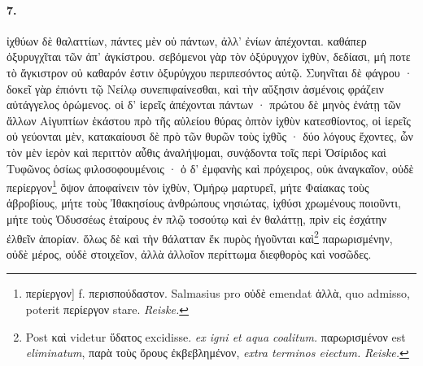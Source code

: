 \documentclass[a4paper, 11pt, oneside, polutonikogreek, german, landscape]{article}
\begin{document}
\paragraph{7.}
ἰχθύων δὲ θαλαττίων, πάντες μὲν οὐ πάντων, ἀλλ' ἐνίων ἀπέχονται. καθάπερ ὀξυρυγχῖται τῶν ἀπ' ἀγκίστρου. σεβόμενοι γὰρ τὸν ὀξύρυγχον ἰχθὺν, δεδίασι, μή ποτε τὸ ἄγκιστρον οὐ καθαρόν ἐστιν ὀξυρύγχου περιπεσόντος αὐτῷ. Συηνῖται δὲ φάγρου · δοκεῖ γὰρ ἐπιόντι τῷ Νείλῳ συνεπιφαίνεσθαι, καὶ τὴν αὔξησιν ἀσμένοις φράζειν αὐτάγγελος ὁρώμενος. οἱ δ' ἱερεῖς ἀπέχονται πάντων · πρώτου δὲ μηνὸς ἐνάτῃ τῶν ἄλλων Αἰγυπτίων ἑκάστου πρὸ τῆς αὐλείου θύρας ὀπτὸν ἰχθὺν κατεσθίοντος, οἱ ἱερεῖς οὐ γεύονται μὲν, κατακαίουσι δὲ πρὸ τῶν θυρῶν τοὺς ἰχθῦς · δύο λόγους ἔχοντες, ὧν τὸν μὲν ἱερὸν καὶ περιττὸν αὖθις ἀναλήψομαι, συνᾴδοντα τοῖς περὶ Ὀσίριδος καὶ Τυφῶνος ὁσίως φιλοσοφουμένοις · ὁ δ' ἐμφανὴς καὶ πρόχειρος, οὐκ ἀναγκαῖον, οὐδὲ περίεργον\footnote{περίεργον] f. περισπούδαστον. Salmasius pro οὐδὲ emendat ἀλλὰ, quo admisso, poterit περίεργον stare. \emph{Reiske.}} ὄψον ἀποφαίνειν τὸν ἰχθὺν, Ὁμήρῳ μαρτυρεῖ, μήτε Φαίακας τοὺς ἁβροβίους, μήτε τοὺς Ἰθακησίους ἀνθρώπους νησιώτας, ἰχθύσι χρωμένους ποιοῦντι, μήτε τοὺς Ὀδυσσέως ἑταίρους ἐν πλῷ τοσούτῳ καὶ ἐν θαλάττῃ, πρὶν εἰς ἐσχάτην ἐλθεῖν ἀπορίαν. ὅλως δὲ καὶ τὴν θάλατταν ἔκ πυρὸς ἡγοῦνται καὶ\footnote{Post καὶ videtur ὕδατος excidisse. \emph{ex igni et aqua coalitum.} παρωρισμένον est \emph{eliminatum}, παρὰ τοὺς ὅρους ἐκβεβλημένον, \emph{extra terminos eiectum.} \emph{Reiske.}} παρωρισμένην, οὐδὲ μέρος, οὐδὲ στοιχεῖον, ἀλλὰ ἀλλοῖον περίττωμα διεφθορὸς καὶ νοσῶδες.
\end{document}
